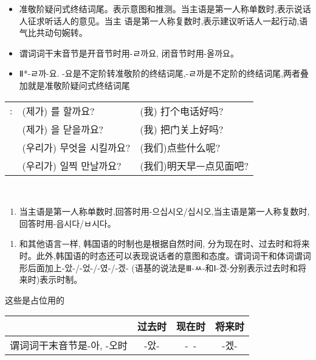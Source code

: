 \begin{grammar}
	\begin{grammarsect}[ -(으)ㄹ까요]
		\begin{itemize}
			\item 准敬阶疑问式终结词尾。表示意图和推测。当主语是第一人称单数时,表示说话人征求听话人的意见。当主 语是第一人称复数时,表示建议听话人一起行动,语气比共动句婉转。
			\item 谓词词干末音节是开音节时用-ㄹ까요, 闭音节时用-올까요。
			\item {\color{gray} Ⅱ*-ㄹ까-요. -요是不定阶转准敬阶的终结词尾,-ㄹ까是不定阶的终结词尾,两者叠加就是准敬阶疑问式终结词尾}
		\end{itemize}
		\begin{tabular}{lll}
			\kr \ruby{例}{예}: &\kr  (제가) \ruby{電話}{전화}를 할까요?     & (我) 打个电话好吗?   \\
			             &\kr  (제가) \ruby{門}{문}을 닫을까요?      & (我) 把门关上好吗?   \\
			             &\kr  (우리가) 무엇을 시킬까요?              & (我们)点些什么呢?    \\
			             &\kr  (우리가) \ruby{來日}{내일} 일찍 만날까요? & (我们)明天早ᅳ点见面吧? \\
		\end{tabular}\\
		\begin{enumerate}
			\item 当主语是第一人称单数时,回答时用-으십시오/십시오,当主语是第一人称复数时,回答时用-읍시다/ㅂ시다。
		\end{enumerate}
	\end{grammarsect}
	\begin{grammarsect}[时制]
		\begin{enumerate}
			\item 和其他语言ᅳ样, 韩国语的时制也是根据自然时间, 分为现在时、过去时和将来时。此外,韩国语的时态还可以表现说话者的意图和态度。谓词词干和体词谓词形后面加上-았-/-었-/-였-/-겠-{\color{gray} (语基的说法是Ⅲ-ㅆ-和Ⅰ-겠-分别表示过去时和将来时)}表示时制。
		\end{enumerate}{\color{white} 这些是占位用的}
		\begin{tabular}{|l|c|c|c|}
			\hline
			\diagbox{用法{\color{white} 啊啊啊啊啊啊}}{时制} & 过去时 & 现在时                   & 将来时                  \\\hline
			谓词词干末音节是-아, -오时                        & -았- & \multirow{3}{*}{-\ -} & \multirow{3}{*}{-겠-} \\\cline{1-2}

\end{tabular}
\end{grammarsect}
\end{grammar}
